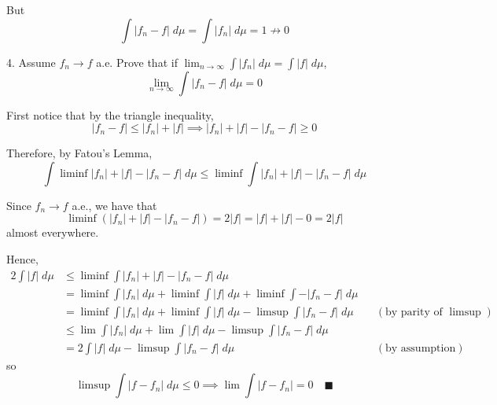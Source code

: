 \documentclass[12pt]{article}
\newcommand{\qed}{\quad \blacksquare}
\newcommand{\abs}[1]{\left\vert #1 \right\vert}
\begin{document}
\begin{itemize}
        But 
        \[\int \abs{f_n - f} \; d\mu = \int \abs{f_n} \; d\mu = 1 \not\to 0\]



    \color{black}

\end{itemize}

\pagebreak  

4. Assume $f_n \to f$ a.e. Prove that if $\lim_{n \to \infty} \int \abs{f_n}\; d\mu = \int \abs{f} \; d\mu$, 
\[\lim_{n \to \infty} \int \abs{f_n - f} \; d\mu = 0\]

    \color{blue}
        First notice that by the triangle inequality, 
        \[\abs{f_n - f} \leq \abs{f_n} + \abs{f} \implies \abs{f_n} + \abs{f} - \abs{f_n - f} \geq 0\]

        Therefore, by Fatou's Lemma,
        \[\int \liminf \abs{f_n} + \abs{f} - \abs{f_n - f} \; d\mu \leq \liminf \int \abs{f_n} + \abs{f} - \abs{f_n - f} \; d\mu\]

        Since $f_n \to f$ a.e., we have that 
        \[\liminf \left(\abs{f_n} + \abs{f} - \abs{f_n - f}\right)  = 2\abs{f} = \abs{f} + \abs{f} - 0 = 2\abs{f}\] 
        almost everywhere. 
        
        Hence, 
        \begin{align*}
            2\int \abs{f} \; d\mu &\leq \liminf \int \abs{f_n} + \abs{f} - \abs{f_n - f} \; d\mu\\
            &= \liminf \int \abs{f_n} \; d\mu + \liminf\int \abs{f} \; d\mu + \liminf \int -\abs{f_n - f} \; d\mu\\
            &= \liminf \int \abs{f_n} \; d\mu + \liminf\int \abs{f} \; d\mu  - \limsup \int \abs{f_n - f} \; d\mu && (\text{by parity of } \limsup)\\ 
            &\leq \lim \int \abs{f_n} \; d\mu + \lim \int \abs{f} \; d\mu  - \limsup \int \abs{f_n - f} \; d\mu\\
            &= 2\int \abs{f} \; d\mu - \limsup \int \abs{f_n - f} \; d\mu && (\text{by assumption})
        \end{align*}
        so 
        \[\limsup \int \abs{f - f_n} \; d\mu \leq 0 \implies \lim \int \abs{f - f_n} = 0 \qed\]


    \color{black}
\end{document}

